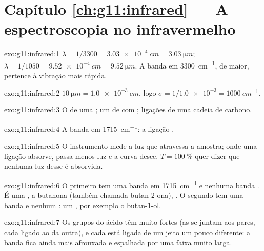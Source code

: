 \section*{Capítulo \ref{ch:g11:infrared} --- A espectroscopia no infravermelho}

\begin{solution}{exo:g11:infrared:1}
$\lambda = 1/3300 = \qty{3.03e-4}{cm} = \qty{3.03}{\micro m}$;
$\lambda = 1/1050 = \qty{9.52e-4}{cm} = \qty{9.52}{\micro m}$. A banda em
\qty{3300}{cm^{-1}}, de  maior, pertence à vibração mais
rápida.
\end{solution}

\begin{solution}{exo:g11:infrared:2}
$\qty{10}{\micro m} = \qty{1.0e-3}{cm}$, logo $\sigma = 1/\num{1.0e-3} =
\qty{1000}{cm^{-1}}$.
\end{solution}

\begin{solution}{exo:g11:infrared:3}
O  de uma ; um  de  com ; ligações  de uma cadeia de carbono.
\end{solution}

\begin{solution}{exo:g11:infrared:4}
A banda em \qty{1715}{cm^{-1}}: a ligação .
\end{solution}

\begin{solution}{exo:g11:infrared:5}
O instrumento mede a luz que atravessa a amostra; onde uma ligação
absorve, passa menos luz e a curva desce. $T =
\qty{100}{\percent}$ quer dizer que nenhuma luz desse  é
absorvida.
\end{solution}

\begin{solution}{exo:g11:infrared:6}
O primeiro tem uma banda  em \qty{1715}{cm^{-1}} e nenhuma banda
. É uma , a butanona (também chamada butan-2-ona),
. O segundo tem uma banda  e nenhum : um
, por exemplo o butan-1-ol.
\end{solution}

\begin{solution}{exo:g11:infrared:7}
Os grupos  do ácido têm  muito fortes (as
 se juntam aos pares, cada  ligado ao  da
outra), e cada  está ligada de um jeito um pouco diferente: a
banda fica ainda mais afrouxada e espalhada por uma faixa muito larga.
\end{solution}

